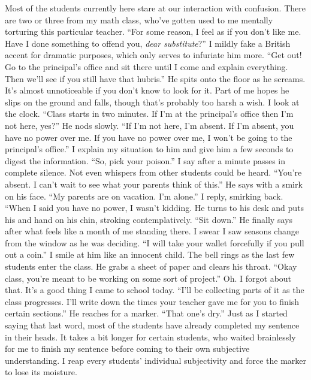 \documentclass[a4paper, 12pt]{book}
\begin{document}
\newline
\tab
Most of the students currently here stare at our interaction with confusion. There are two or three from my math class, who’ve gotten used to me mentally torturing this particular teacher. ``For some reason, I feel as if you don’t like me. Have I done something to offend you, \textit{dear substitute}?'' I mildly fake a British accent for dramatic purposes, which only serves to infuriate him more.
\newline
\tab
``Get out! Go to the principal’s office and sit there until I come and explain everything. Then we’ll see if you still have that hubris.'' He spits onto the floor as he screams. It’s almost unnoticeable if you don’t know to look for it. Part of me hopes he slips on the ground and falls, though that’s probably too harsh a wish.
\newline
\tab
I look at the clock. ``Class starts in two minutes. If I’m at the principal’s office then I’m not here, yes?'' He nods slowly. ``If I’m not here, I’m absent. If I’m absent, you have no power over me. If you have no power over me, I won’t be going to the principal’s office.'' I explain my situation to him and give him a few seconds to digest the information. ``So, pick your poison.'' I say after a minute passes in complete silence. Not even whispers from other students could be heard.
\newline
\tab
``You’re absent. I can’t wait to see what your parents think of this.'' He says with a smirk on his face.
\newline
\tab
``My parents are on vacation. I’m alone.'' I reply, smirking back. ``When I said you have no power, I wasn’t kidding.
\newline
\tab
He turns to his desk and puts his and hand on his chin, stroking contemplatively. ``Sit down.'' He finally says after what feels like a month of me standing there. I swear I saw seasons change from the window as he was deciding. ``I will take your wallet forcefully if you pull out a coin.'' I smile at him like an innocent child. The bell rings as the last few students enter the class. He grabs a sheet of paper and clears his throat. ``Okay class, you’re meant to be working on some sort of project.'' Oh. I forgot about that. It’s a good thing I came to school today. ``I’ll be collecting parts of it as the class progresses. I’ll write down the times your teacher gave me for you to finish certain sections.''
\newline
\tab
He reaches for a marker. ``That one’s dry.'' Just as I started saying that last word, most of the students have already completed my sentence in their heads. It takes a bit longer for certain students, who waited brainlessly for me to finish my sentence before coming to their own subjective understanding. I reap every students’ individual subjectivity and force the marker to lose its moisture.
\end{document}
